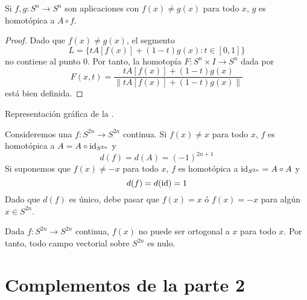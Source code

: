 \begin{proposition}
Si $f,g\colon S^n \to S^n$ son aplicaciones con $f(x)\neq g(x)$ para todo $x$,
$g$ es homotópica a $A\circ f$.
\end{proposition}

\begin{proof}
Dado que $f(x)\neq g(x)$, el segmento
\[L=\{tA[f(x)]+(1-t)g(x)\colon t \in [0,1]\}\]
no contiene al punto $0$. Por tanto, la homotopía $F\colon S^n\times I \to
S^n$ dada por
\[F(x,t)=\frac{tA[f(x)]+(1-t)g(x)}{\|tA[f(x)]+(1-t)g(x)\|}\]
está bien definida.
\end{proof}

\begin{marginfigure}

\caption{Representación gráfica de la .}
\end{marginfigure}

Consideremos una $f\colon S^{2n} \to S^{2n}$ continua. Si $f(x)\neq x$ para
todo $x$, $f$ es homotópica a $A=A\circ \operatorname{id}_{S^{2n}}$ y
\[d(f)=d(A)=(-1)^{2n+1}\]
Si suponemos que $f(x)\neq -x$ para todo $x$, $f$ es homotópica a
$\operatorname{id}_{S^{2n}}=A\circ A$ y
\[d(f)=d(\operatorname{id})=1\]
Dado que $d(f)$ es único, debe pasar que $f(x)=x$ ó $f(x)=-x$ para algún
$x \in S^{2n}$.

\begin{corollary}
Dada $f\colon S^{2n} \to S^{2n}$ continua, $f(x)$ no puede ser ortogonal a $x$
para todo $x$. Por tanto, todo campo vectorial sobre $S^{2n}$ es nulo.
\end{corollary}

\section{Complementos de la parte 2}
